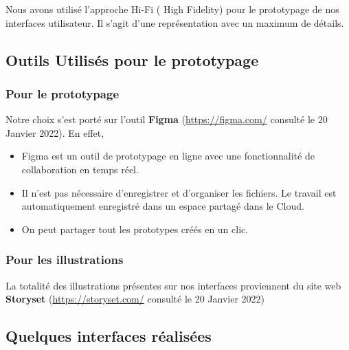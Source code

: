 Nous avons utilisé l'approche Hi-Fi ( High Fidelity) pour le prototypage de nos interfaces utilisateur. Il s'agit d'une représentation avec un maximum de détails.
\subsection{Outils Utilisés pour le prototypage}
\subsubsection{Pour le prototypage}
Notre choix s'est porté sur l'outil \textbf{Figma} (\href{https://figma.com/}{https://figma.com/} consulté le 20 Janvier 2022). En effet,
\begin{itemize}
    \item Figma est un outil de prototypage en ligne avec une fonctionnalité de collaboration en temps réel.
    \item Il n'est pas nécessaire d'enregistrer et d'organiser les fichiers. Le travail est automatiquement enregistré dans un espace partagé dans le Cloud.
    \item On peut partager tout les prototypes créés en un clic.
\end{itemize}

\subsubsection{Pour les illustrations}
La totalité des illustrations présentes sur nos interfaces proviennent du site web \textbf{Storyset} (\href{https://storyset.com/}{https://storyset.com/} consulté le 20 Janvier 2022)

\subsection{Quelques interfaces réalisées}
